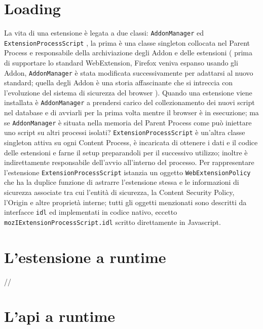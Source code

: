 \documentclass{sapthesis}
\newcommand{\code}[1]{\texttt{#1}}
\newcommand{\idl}{\code{idl} }
\newcommand{\AddonManager}{\code{AddonManager} }
\newcommand{\ExtensionProcessScript}{\code{ExtensionProcessScript} }
\newcommand{\WebExtensionPolicy}{\code{WebExtensionPolicy} }
\begin{document}
    \section{ Loading }
        La vita di una estensione è legata a due classi: \AddonManager ed \ExtensionProcessScript,
        la prima è una classe singleton collocata nel Parent Process e responsabile della archiviazione
        degli Addon e delle estensioni ( prima di supportare lo standard WebExtension, Firefox veniva espanso
        usando gli Addon, \AddonManager è stata modificata successivamente per adattarsi al nuovo standard; quella degli
        Addon è una storia affascinante che si intreccia con l'evoluzione del sistema di sicurezza del browser ).
        Quando una estensione viene installata è \AddonManager a prendersi carico del collezionamento dei nuovi
        script nel database e di avviarli per la prima volta mentre il browser è in esecuzione; ma se \AddonManager
        è situata nella memoria del Parent Process come può iniettare uno script su altri processi isolati?
        \ExtensionProcessScript è un'altra classe singleton attiva su ogni Content Process, è incaricata di
        ottenere i dati e il codice delle estensioni e farne il setup preparandoli per il successivo utilizzo;
        inoltre è indirettamente responsabile dell'avvio all'interno del processo. Per rappresentare l'estensione
        \ExtensionProcessScript istanzia un oggetto \WebExtensionPolicy che ha la duplice funzione di astrarre
        l'estensione stessa e le informazioni di sicurezza associate tra cui l'entità di sicurezza,
        la Content Security Policy, l'Origin e altre proprietà interne; tutti gli oggetti menzionati sono
        descritti da interfacce \idl ed implementati in codice nativo, eccetto \code{mozIExtensionProcessScript.idl}
        scritto direttamente in Javascript.
         
    \section{}


    \section{L'estensione a runtime}
        //
    
    \section{L'api a runtime}
    \label{sec:webextension-api-rpc}
\end{document}
